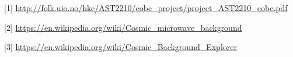 \documentclass{emulateapj}
\begin{document}
\begin{thebibliography}{}
[1]
\url{http://folk.uio.no/hke/AST2210/cobe_project/project_AST2210_cobe.pdf} \break

[2]
\url{https://en.wikipedia.org/wiki/Cosmic_microwave_background} \break

[3]
\url{https://en.wikipedia.org/wiki/Cosmic_Background_Explorer}
\end{thebibliography}







%
%



\end{document}
